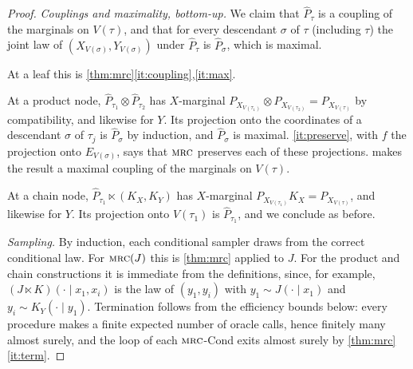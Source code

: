 \documentclass[11pt]{article}
\theoremstyle{definition}
\newcommand{\hP}{\hat P}
\newcommand{\MRC}{\textnormal{\textsc{mrc}}}
\newcommand{\Var}{V}
\begin{document}
\begin{proof}
\emph{Couplings and maximality, bottom-up.} We claim that $\hP_\tau$ is a
coupling of the marginals on $\Var(\tau)$, and that for every descendant
$\sigma$ of $\tau$ (including $\tau$) the joint law of
$(X_{\Var(\sigma)},Y_{\Var(\sigma)})$ under $\hP_\tau$ is $\hP_\sigma$, which is
maximal.

At a leaf this is \cref{thm:mrc}\ref{it:coupling},\ref{it:max}.

At a product node, $\hP_{\tau_1}\otimes\hP_{\tau_2}$ has $X$-marginal
$P_{X_{\Var(\tau_1)}}\otimes P_{X_{\Var(\tau_2)}}=P_{X_{\Var(\tau)}}$ by
compatibility, and likewise for $Y$. Its projection onto the coordinates of a
descendant $\sigma$ of $\tau_j$ is $\hP_\sigma$ by induction, and $\hP_\sigma$
is maximal. \ref{it:preserve}, with $f$ the projection onto
$E_{\Var(\sigma)}$, says that $\MRC$ preserves each of these projections.
 makes the result a maximal coupling of the marginals on
$\Var(\tau)$.

At a chain node, $\hP_{\tau_1}\ltimes(K_X,K_Y)$ has $X$-marginal
$P_{X_{\Var(\tau_1)}}K_X=P_{X_{\Var(\tau)}}$, and likewise for $Y$. Its
projection onto $\Var(\tau_1)$ is $\hP_{\tau_1}$, and we conclude as before.

\emph{Sampling.} By induction, each conditional sampler draws from the correct
conditional law. For $\MRC(J)$ this is \cref{thm:mrc} applied to $J$. For the
product and chain constructions it is immediate from the definitions, since,
for example, $(J\ltimes K)(\cdot\mid x_1,x_i)$ is the law of
$(y_1,y_i)$ with $y_1\sim J(\cdot\mid x_1)$ and $y_i\sim K_Y(\cdot\mid y_1)$.
Termination follows from the efficiency bounds below: every procedure makes a
finite expected number of oracle calls, hence finitely many almost surely, and
the loop of each $\MRC$-Cond exits almost surely by \cref{thm:mrc}\ref{it:term}.


\end{proof}
\end{document}
